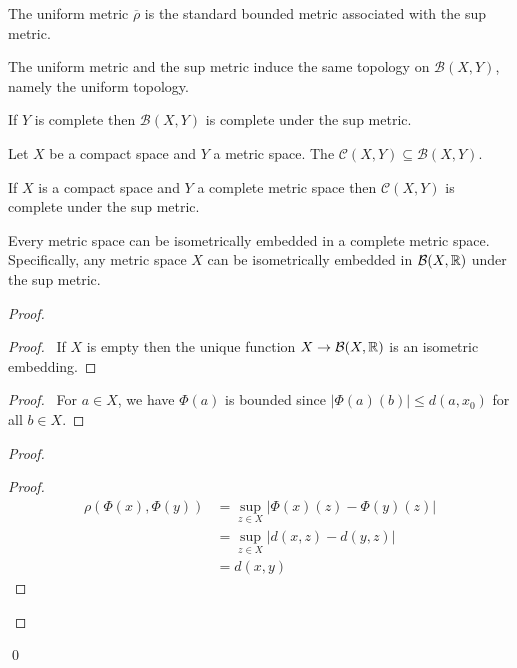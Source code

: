 \begin{proposition}
    The uniform metric $\overline{\rho}$ is the standard bounded metric associated with the sup metric.
\end{proposition}

\begin{corollary}
    The uniform metric and the sup metric induce the same topology on $\mathcal{B}(X,Y)$, namely the uniform topology.
\end{corollary}

\begin{corollary}
    If $Y$ is complete then $\mathcal{B}(X,Y)$ is complete under the sup metric.
\end{corollary}

\begin{proposition}
    Let $X$ be a compact space and $Y$ a metric space. The $\mathcal{C}(X,Y) \subseteq \mathcal{B}(X,Y)$.
\end{proposition}

\begin{corollary}
    If $X$ is a compact space and $Y$ a complete metric space then $\mathcal{C}(X,Y)$ is complete under the sup metric.
\end{corollary}

\begin{theorem}
    \label{theorem:completion}
    Every metric space can be isometrically embedded in a complete metric space. Specifically, any metric space $X$ can be
    isometrically embedded in $\mathcal{B}(X,\mathbb{R})$ under the sup metric.
\end{theorem}

\begin{proof}
    \pf
    \begin{proof}
        \pf\ If $X$ is empty then the unique function $X \rightarrow \mathcal{B}(X, \mathbb{R})$ is an isometric embedding.
    \end{proof}
    \begin{proof}
        \pf\ For $a \in X$, we have $\Phi(a)$ is bounded since $|\Phi(a)(b)| \leq d(a,x_0)$ for all $b \in X$.
    \end{proof}
    \begin{proof}
        \begin{proof}
            \pf
            \begin{align*}
                \rho(\Phi(x),\Phi(y)) & = \sup_{z \in X} |\Phi(x)(z) - \Phi(y)(z)| \\
                & = \sup_{z \in X}|d(x,z) - d(y,z)| \\
                & = d(x,y)
            \end{align*}
        \end{proof}
    \end{proof}
    \qed
\end{proof}

